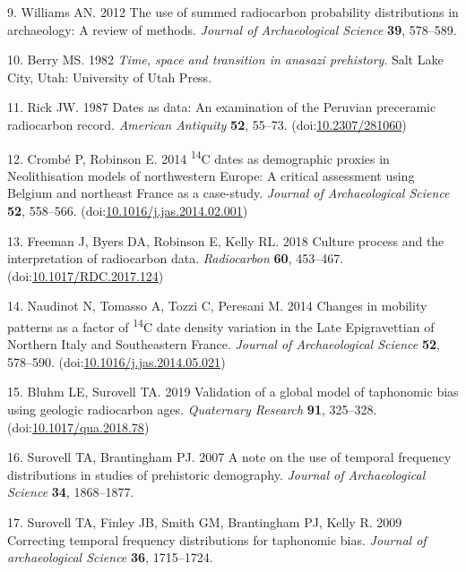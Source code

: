 \documentclass[
]{sa}
\newenvironment{cslreferences}%
  {}%
  {\par}
\begin{document}
\begin{cslreferences}
\leavevmode\hypertarget{ref-Williams2012}{}%
9. Williams AN. 2012 The use of summed radiocarbon probability distributions in archaeology: A review of methods. \emph{Journal of Archaeological Science} \textbf{39}, 578--589.

\leavevmode\hypertarget{ref-Berry1982}{}%
10. Berry MS. 1982 \emph{Time, space and transition in anasazi prehistory}. Salt Lake City, Utah: University of Utah Press.

\leavevmode\hypertarget{ref-Rick1987}{}%
11. Rick JW. 1987 Dates as data: An examination of the Peruvian preceramic radiocarbon record. \emph{American Antiquity} \textbf{52}, 55--73. (doi:\href{https://doi.org/10.2307/281060}{10.2307/281060})

\leavevmode\hypertarget{ref-Crombe2014}{}%
12. Crombé P, Robinson E. 2014 \textsuperscript{14}C dates as demographic proxies in Neolithisation models of northwestern Europe: A critical assessment using Belgium and northeast France as a case-study. \emph{Journal of Archaeological Science} \textbf{52}, 558--566. (doi:\href{https://doi.org/10.1016/j.jas.2014.02.001}{10.1016/j.jas.2014.02.001})

\leavevmode\hypertarget{ref-Freeman2018}{}%
13. Freeman J, Byers DA, Robinson E, Kelly RL. 2018 Culture process and the interpretation of radiocarbon data. \emph{Radiocarbon} \textbf{60}, 453--467. (doi:\href{https://doi.org/10.1017/RDC.2017.124}{10.1017/RDC.2017.124})

\leavevmode\hypertarget{ref-Naudinot2014}{}%
14. Naudinot N, Tomasso A, Tozzi C, Peresani M. 2014 Changes in mobility patterns as a factor of \textsuperscript{14}C date density variation in the Late Epigravettian of Northern Italy and Southeastern France. \emph{Journal of Archaeological Science} \textbf{52}, 578--590. (doi:\href{https://doi.org/10.1016/j.jas.2014.05.021}{10.1016/j.jas.2014.05.021})

\leavevmode\hypertarget{ref-Bluhm2019}{}%
15. Bluhm LE, Surovell TA. 2019 Validation of a global model of taphonomic bias using geologic radiocarbon ages. \emph{Quaternary Research} \textbf{91}, 325--328. (doi:\href{https://doi.org/10.1017/qua.2018.78}{10.1017/qua.2018.78})

\leavevmode\hypertarget{ref-Surovell2007}{}%
16. Surovell TA, Brantingham PJ. 2007 A note on the use of temporal frequency distributions in studies of prehistoric demography. \emph{Journal of Archaeological Science} \textbf{34}, 1868--1877.

\leavevmode\hypertarget{ref-Surovell2009}{}%
17. Surovell TA, Finley JB, Smith GM, Brantingham PJ, Kelly R. 2009 Correcting temporal frequency distributions for taphonomic bias. \emph{Journal of archaeological Science} \textbf{36}, 1715--1724.


\end{cslreferences}
\end{document}

